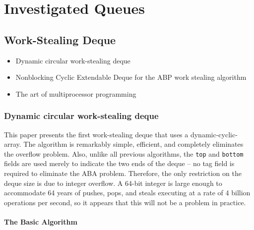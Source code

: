 
\chapter{Investigated Queues}
\label{chap:queues-implementation}

\section{Work-Stealing Deque}
\label{sec:queues-implementation-ws-deque}

\begin{itemize}
\item Dynamic circular work-stealing deque \cite{Chase2005}
\item Nonblocking Cyclic Extendable Deque for the ABP work stealing
  algorithm \cite{Lev2005}
\item The art of multiprocessor programming \cite{Herlihy2008}
\end{itemize}


\subsection{Dynamic circular work-stealing deque \cite{Chase2005}}

This paper presents the first work-stealing deque that uses a
dynamic-cyclic-array. The algorithm is remarkably simple, efficient,
and completely eliminates the overflow problem. Also, unlike all
previous algorithms, the \lstinline!top! and \lstinline!bottom! fields
are used merely to indicate the two ends of the deque -- no tag field
is required to eliminate the ABA problem. Therefore, the only
restriction on the deque size is due to integer overflow. A 64-bit
integer is large enough to accommodate 64 years of pushes, pops, and
steals executing at a rate of 4 billion operations per second, so it
appears that this will not be a problem in practice.

\subsubsection{The Basic Algorithm}


